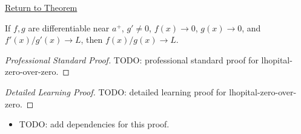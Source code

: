 \newpage
{}
\label{prf:lhopital-zero-over-zero}

\begin{remark*}[Return]
\hyperref[thm:lhopital-zero-over-zero]{Return to Theorem}
\end{remark*}

\begin{theorem*}
If \(f,g\) are differentiable near \(a^+\), \(g'\neq 0\), \(f(x)\to 0\), \(g(x)\to 0\), and \(f'(x)/g'(x)\to L\), then \(f(x)/g(x)\to L\).
\end{theorem*}

\begin{proof}[Professional Standard Proof]
\LRAProofBodyStart
TODO: professional standard proof for lhopital-zero-over-zero.
\end{proof}

\begin{proof}[Detailed Learning Proof]
\LRAProofBodyStart
TODO: detailed learning proof for lhopital-zero-over-zero.
\end{proof}

\begin{remark*}
\end{remark*}

\begin{dependencies}
\begin{itemize}
  \item TODO: add dependencies for this proof.
\end{itemize}
\end{dependencies}

\clearpage
